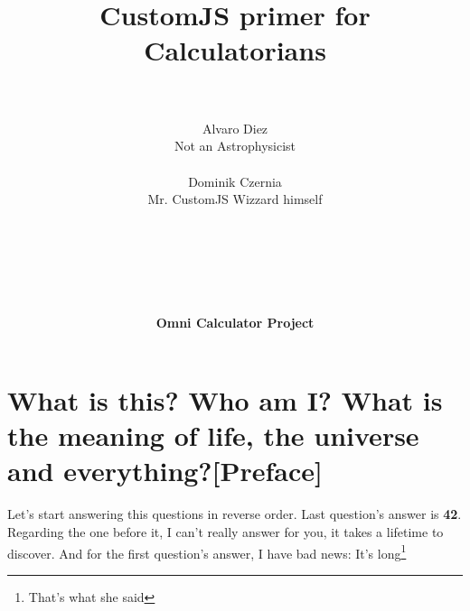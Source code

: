 \documentclass[11pt,a4paper,oldfontcommands]{memoir}
\begin{document}
%
%
\thispagestyle{empty}

{%

\centering
\title{ \normalsize \textsc{}
		\\ [2.0cm]
		\hline \vspace{10pt} \\
		\huge \textbf{CustomJS primer for Calculatorians\textsuperscript{\textregistered}} \vspace{5pt}
		\textbf{\hline}{\hline} \\ [0.5cm]
		\large \vspace{200pt}\\}		}
		


\author{\LARGE Alvaro Diez \\
		Not an Astrophysicist\texttrademark \\ \\
		\LARGE Dominik Czernia \\
		Mr. CustomJS Wizzard himself \\ \\ \\ \\ \\ \\ \\
		\LARGE {\textbf{Omni Calculator Project}} \vspace{-50pt}
} 
		
\maketitle
\noalign
\clearpage

\tableofcontents

\clearpage


\chapter{What is this? Who am I? What is the meaning of life, the universe and everything?[Preface]}
    \label{preface}

    Let's start answering this questions in reverse order. Last question's answer is \textbf{42}. Regarding the one before it, I can't really answer for you, it takes a lifetime to discover. And for the first question's answer, I have bad news: It's long\footnote{That's what she said}
\end{document}

